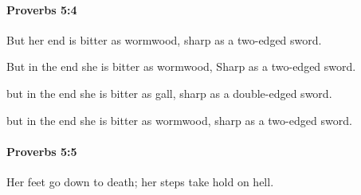 		\paragraph{Proverbs 5:4} %
			\label{PROVERBS-5-4}

			But her end is bitter as wormwood, sharp as a two-edged sword.

			\begin{versebox}
					\item[BHS] 
					\item[ASV] But in the end she is bitter as wormwood, Sharp as a two-edged sword.
					\item[NIV] but in the end she is bitter as gall, sharp as a double-edged sword.
					\item[NRSV] but in the end she is bitter as wormwood, sharp as a two-edged sword.
			\end{versebox}

		\paragraph{Proverbs 5:5} %
			\label{PROVERBS-5-5}

			Her feet go down to death; her steps take hold on hell.

